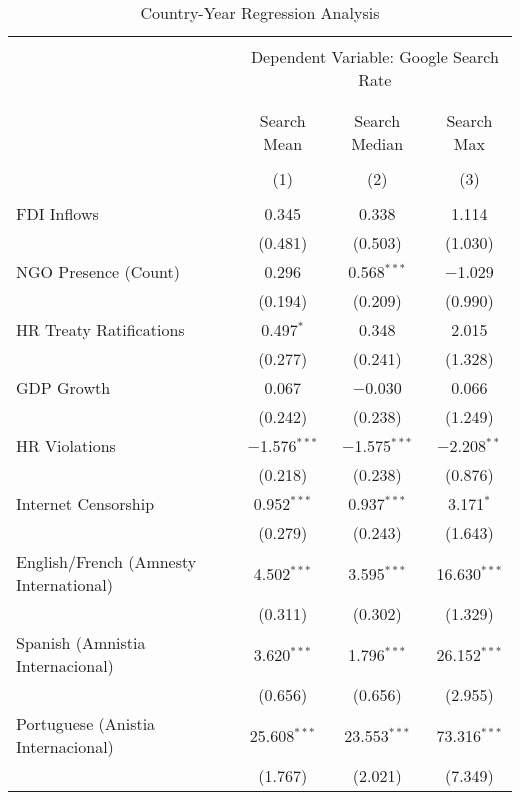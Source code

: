 
\begin{table}[!htbp] \centering 
  \caption{Country-Year Regression Analysis} 
  \label{} 
\begin{tabular}{@{\extracolsep{5pt}}lccc} 
\\[-1.8ex]\hline 
\hline \\[-1.8ex] 
 & \multicolumn{3}{c}{Dependent Variable: Google Search Rate} \\ 
\cline{2-4} 
\\[-1.8ex] & \multicolumn{3}{c}{ } \\ 
 & Search Mean & Search Median & Search Max \\ 
\\[-1.8ex] & (1) & (2) & (3)\\ 
\hline \\[-1.8ex] 
 FDI Inflows & 0.345 & 0.338 & 1.114 \\ 
  & (0.481) & (0.503) & (1.030) \\ 
  NGO Presence (Count) & 0.296 & 0.568$^{***}$ & $-$1.029 \\ 
  & (0.194) & (0.209) & (0.990) \\ 
  HR Treaty Ratifications & 0.497$^{*}$ & 0.348 & 2.015 \\ 
  & (0.277) & (0.241) & (1.328) \\ 
  GDP Growth & 0.067 & $-$0.030 & 0.066 \\ 
  & (0.242) & (0.238) & (1.249) \\ 
  HR Violations & $-$1.576$^{***}$ & $-$1.575$^{***}$ & $-$2.208$^{**}$ \\ 
  & (0.218) & (0.238) & (0.876) \\ 
  Internet Censorship & 0.952$^{***}$ & 0.937$^{***}$ & 3.171$^{*}$ \\ 
  & (0.279) & (0.243) & (1.643) \\ 
  English/French (Amnesty International) & 4.502$^{***}$ & 3.595$^{***}$ & 16.630$^{***}$ \\ 
  & (0.311) & (0.302) & (1.329) \\ 
  Spanish (Amnistia Internacional) & 3.620$^{***}$ & 1.796$^{***}$ & 26.152$^{***}$ \\ 
  & (0.656) & (0.656) & (2.955) \\ 
  Portuguese (Anistia Internacional) & 25.608$^{***}$ & 23.553$^{***}$ & 73.316$^{***}$ \\ 
  & (1.767) & (2.021) & (7.349) \\ 

\end{tabular}
\end{table}
